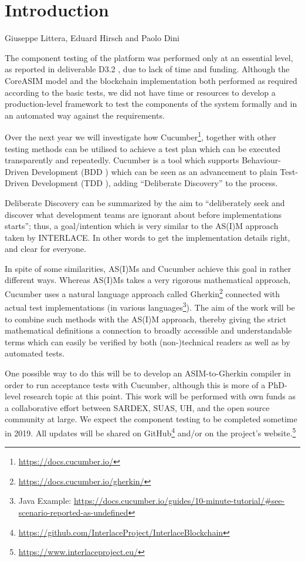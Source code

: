 \chapter{Introduction}
\label{ch:Introduction}

\vspace{-1cm}
\begin{center}
Giuseppe Littera, Eduard Hirsch and Paolo Dini
\end{center}

The component testing of the platform was performed only at an essential level, as reported in deliverable D3.2 \cite{INTERLACE_D32}, due to lack of time and funding. Although the CoreASIM model and the blockchain implementation both performed as required according to the basic tests, we did not have time or resources to develop a production-level framework to test the components of the system formally and in an automated way against the requirements.

Over the next year we will investigate how Cucumber\footnote{\url{https://docs.cucumber.io/}}, together with other testing methods can be utilised to achieve a test plan which can be executed transparently and repeatedly. Cucumber is a tool which supports Behaviour-Driven Development (BDD \cite{wynne2017cucumber}) which can be seen as an advancement to plain Test-Driven Development (TDD \cite{beck2003test}), adding ``Deliberate Discovery'' to the process.

Deliberate Discovery can be summarized by the aim to ``deliberately seek and discover what development teams are ignorant about before implementations starts''; thus, a goal/intention which is very similar to the AS(I)M approach taken by INTERLACE. In other words to get the implementation details right, and clear for everyone.

In spite of some similarities, AS(I)Ms and Cucumber achieve this goal in rather different ways. Whereas AS(I)Ms takes a very rigorous mathematical approach, Cucumber uses a natural language approach called Gherkin\footnote{\url{https://docs.cucumber.io/gherkin/}} connected with actual test implementations (in various languages\footnote{Java Example: \url{https://docs.cucumber.io/guides/10-minute-tutorial/\#see-scenario-reported-as-undefined}}). The aim of the work will be to combine such methods with the AS(I)M approach, thereby giving the strict mathematical definitions a connection to broadly accessible and understandable terms which can easily be verified by both (non-)technical readers as well as by automated tests.

One possible way to do this will be to develop an ASIM-to-Gherkin compiler in order to run acceptance tests with Cucumber, although this is more of a PhD-level research topic at this point. This work will be performed with own funds as a collaborative effort between SARDEX, SUAS, UH, and the open source community at large. We expect the component testing to be completed sometime in 2019. All updates will be shared on GitHub\footnote{\url{https://github.com/InterlaceProject/InterlaceBlockchain}} and/or on the project's website.\footnote{\url{https://www.interlaceproject.eu/}} 

\newpage
